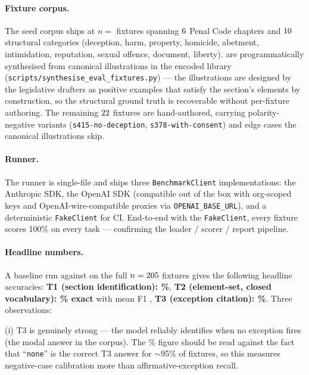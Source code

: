 \paragraph{Fixture corpus.} The seed corpus ships at $n =$
\statBenchmarkFixtures{} fixtures spanning $6$
Penal Code chapters and $10$ structural
categories (deception, harm, property, homicide, abetment,
intimidation, reputation, sexual offence, document, liberty).
\statBenchmarkSynth{} are programmatically synthesised from
canonical illustrations in the encoded library
(\texttt{scripts/synthesise\_eval\_fixtures.py}) --- the
illustrations are designed by the legislative drafters as positive
examples that satisfy the section's elements by construction, so
the structural ground truth is recoverable without per-fixture
authoring. The remaining $22$ fixtures are
hand-authored, carrying polarity-negative variants
(\texttt{s415-no-deception}, \texttt{s378-with-consent}) and
edge cases the canonical illustrations skip.

\paragraph{Runner.} The runner is single-file and ships
three \texttt{BenchmarkClient} implementations: the Anthropic SDK,
the OpenAI SDK (compatible out of the box with org-scoped keys
and OpenAI-wire-compatible proxies via
\texttt{OPENAI\_BASE\_URL}), and a deterministic
\texttt{FakeClient} for CI. End-to-end with the
\texttt{FakeClient}, every fixture scores 100\% on every task
--- confirming the loader / scorer / report pipeline.

\paragraph{Headline numbers.}
A baseline run against \statBenchmarkLlmModel{} on the full
$n = 205{}$ fixtures gives the following
headline accuracies:
\textbf{T1 (section identification): \statBenchmarkLlmTone{}\%},
\textbf{T2 (element-set, closed vocabulary): \statBenchmarkLlmTtwo{}\% exact}
with mean F1 \statBenchmarkLlmTtwoFOne{},
\textbf{T3 (exception citation): \statBenchmarkLlmTthree{}\%}.
Three observations:

(i) T3 is genuinely strong --- the model reliably identifies
when no exception fires (the modal answer in the corpus). The
\statBenchmarkLlmTthree{}\% figure should be read against the
fact that ``\texttt{none}'' is the correct T3 answer for
$\sim$95\% of fixtures, so this measures negative-case
calibration more than affirmative-exception recall.

